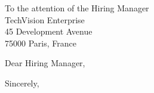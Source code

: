 \documentclass[11pt, a4paper]{letter}
\begin{document}
\begin{letter}{
    To the attention of the Hiring Manager \\
    TechVision Enterprise \\
    45 Development Avenue \\
    75000 Paris, France
}

\opening{Dear Hiring Manager,}

\lipsum[1][1-4] 

\lipsum[2][1-6] 

\lipsum[3][1-5]

\lipsum[4][1-3]

\closing{Sincerely,}

\end{letter}
\end{document}
